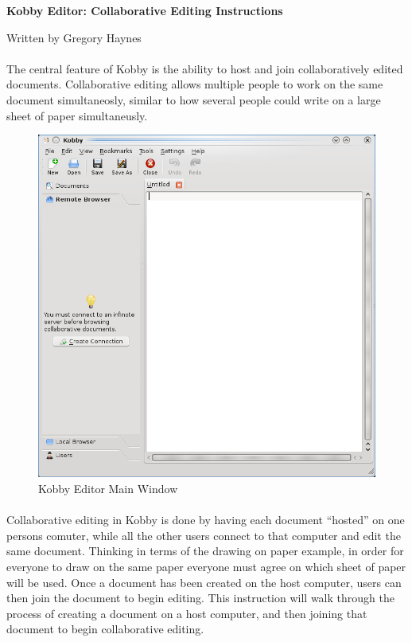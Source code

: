 \documentclass[11pt]{article}
\begin{document}
\centerline {\Large \bf Kobby Editor: Collaborative Editing Instructions}
\centerline {Written by Gregory Haynes}

\paragraph{}The central feature of Kobby is the ability to host and join collaboratively edited documents.  Collaborative editing allows multiple people to work on the same document simultaneosly, similar to how several people could write on a large sheet of paper simultaneusly.

\begin{figure}[tbh]
\begin{center}
\includegraphics[width=.7\textwidth]{kobbymain.png}
\end{center}
\caption{Kobby Editor Main Window}
\end{figure}

\paragraph{}Collaborative editing in Kobby is done by having each document ``hosted'' on one persons comuter, while all the other users connect to that computer and edit the same document.  Thinking in terms of the drawing on paper example, in order for everyone to draw on the same paper everyone must agree on which sheet of paper will be used.  Once a document has been created on the host computer, users can then join the document to begin editing.  This instruction will walk through the process of creating a document on a host computer, and then joining that document to begin collaborative editing.
\end{document}
